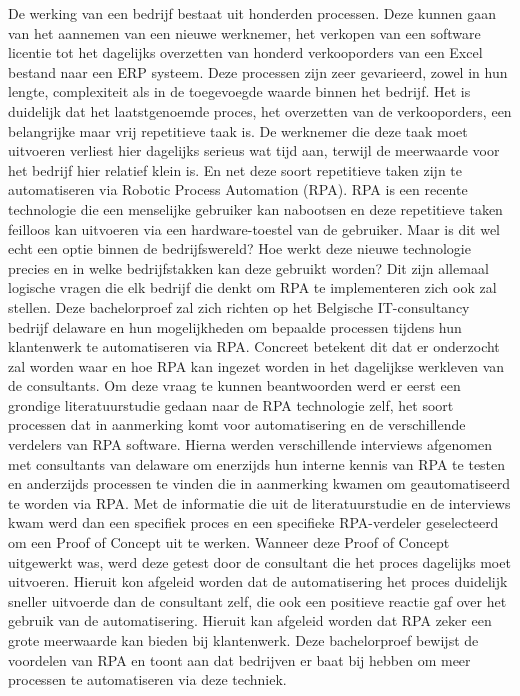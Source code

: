 De werking van een bedrijf bestaat uit honderden processen. Deze kunnen gaan van het aannemen van een nieuwe werknemer, het verkopen van een software licentie tot het dagelijks overzetten van honderd verkooporders van een Excel bestand naar een ERP systeem.
Deze processen zijn zeer gevarieerd, zowel in hun lengte, complexiteit als in de toegevoegde waarde binnen het bedrijf. Het is duidelijk dat het laatstgenoemde proces, het overzetten van de verkooporders, een belangrijke maar vrij repetitieve taak is.
De werknemer die deze taak moet uitvoeren verliest hier dagelijks serieus wat tijd aan, terwijl de meerwaarde voor het bedrijf hier relatief klein is.
En net deze soort repetitieve taken zijn te automatiseren via Robotic Process Automation (RPA). RPA is een recente technologie die een menselijke gebruiker kan nabootsen en deze repetitieve taken feilloos kan uitvoeren via een hardware-toestel van de gebruiker.
Maar is dit wel echt een optie binnen de bedrijfswereld? Hoe werkt deze nieuwe technologie precies en in welke bedrijfstakken kan deze gebruikt worden? Dit zijn allemaal logische vragen die elk bedrijf die denkt om RPA te implementeren zich ook zal stellen.
Deze bachelorproef zal zich richten op het Belgische IT-consultancy bedrijf delaware en hun mogelijkheden om bepaalde processen tijdens hun klantenwerk te automatiseren via RPA.
Concreet betekent dit dat er onderzocht zal worden waar en hoe RPA kan ingezet worden in het dagelijkse werkleven van de consultants.
Om deze vraag te kunnen beantwoorden werd er eerst een grondige literatuurstudie gedaan naar de RPA technologie zelf, het soort processen dat in aanmerking komt voor automatisering en de verschillende verdelers van RPA software.
Hierna werden verschillende interviews afgenomen met consultants van delaware om enerzijds hun interne kennis van RPA te testen en anderzijds processen te vinden die in aanmerking kwamen om geautomatiseerd te worden via RPA.
Met de informatie die uit de literatuurstudie en de interviews kwam werd dan een specifiek proces en een specifieke RPA-verdeler geselecteerd om een Proof of Concept uit te werken.
Wanneer deze Proof of Concept uitgewerkt was, werd deze getest door de consultant die het proces dagelijks moet uitvoeren.
Hieruit kon afgeleid worden dat de automatisering het proces duidelijk sneller uitvoerde dan de consultant zelf, die ook een positieve reactie gaf over het gebruik van de automatisering.
Hieruit kan afgeleid worden dat RPA zeker een grote meerwaarde kan bieden bij klantenwerk. Deze bachelorproef bewijst de voordelen van RPA en toont aan dat bedrijven er baat bij hebben om meer processen te automatiseren via deze techniek.